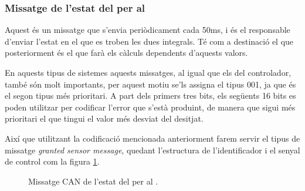 \subsubsection{Missatge de l'estat del \Sensor per al \Controlador}\label{cap:dis:CAN:nou:StoC}

Aquest és un missatge que s'envia periòdicament cada 50ms, i és el responsable d'enviar l'estat en el que es troben les dues integrals. Té com a destinació el \Controlador que posteriorment és el que farà els càlculs dependents d'aquests valors.

En aquests tipus de sistemes aquests missatges, al igual que els del controlador, també són molt importants, per aquest motiu se'ls assigna el tipus 001, ja que és el segon tipus més prioritari. A part dels primers tres bits, els següents 16 bits es poden utilitzar per codificar l'error que s'està produint, de manera que sigui més prioritari el que tingui el valor més desviat del desitjat.

Així que utilitzant la codificació mencionada anteriorment farem servir el tipus de missatge \emph{granted sensor message}, quedant l'estructura de l'identificador i el senyal de control com la figura \ref{fig:bit_encoding:CAN:nou:StoC}.

\begin{figure}[ht!]
	
    \caption{Missatge CAN de l'estat del \Sensor per al \Controlador.}
    \label{fig:bit_encoding:CAN:nou:StoC}
\end{figure}

